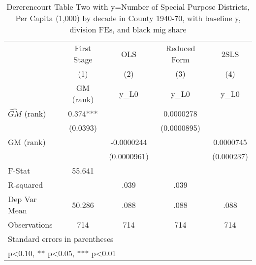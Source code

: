 \begin{table}[htbp]\centering
\def\sym#1{\ifmmode^{#1}\else\(^{#1}\)\fi}
\caption{Dererencourt Table Two with y=Number of Special Purpose Districts, Per Capita (1,000) by decade in County 1940-70, with baseline y, division FEs, and black mig share}
\begin{tabular}{l*{4}{c}}
\toprule
                    & First Stage   &         OLS   &Reduced Form   &        2SLS   \\
                    &\multicolumn{1}{c}{(1)}&\multicolumn{1}{c}{(2)}&\multicolumn{1}{c}{(3)}&\multicolumn{1}{c}{(4)}\\
                    &\multicolumn{1}{c}{GM  (rank)}&\multicolumn{1}{c}{y\_L0}&\multicolumn{1}{c}{y\_L0}&\multicolumn{1}{c}{y\_L0}\\
\midrule
$\hat{GM}$ (rank)   &       0.374***&               &   0.0000278   &               \\
                    &    (0.0393)   &               & (0.0000895)   &               \\
\addlinespace
GM  (rank)          &               &  -0.0000244   &               &   0.0000745   \\
                    &               & (0.0000961)   &               &  (0.000237)   \\
\midrule
F-Stat              &      55.641   &               &               &               \\
R-squared           &               &        .039   &        .039   &               \\
Dep Var Mean        &      50.286   &        .088   &        .088   &        .088   \\
Observations        &         714   &         714   &         714   &         714   \\
\bottomrule
\multicolumn{5}{l}{\footnotesize Standard errors in parentheses}\\
\multicolumn{5}{l}{\footnotesize * p<0.10, ** p<0.05, *** p<0.01}\\
\end{tabular}
\end{table}
